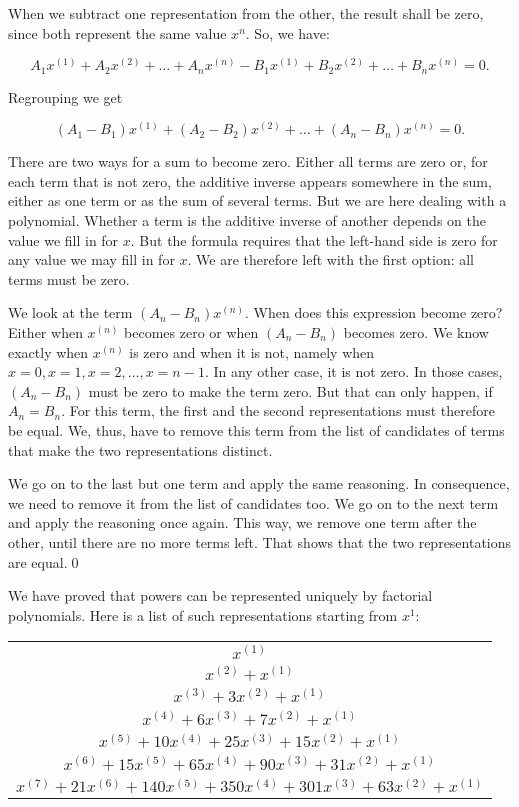 \documentclass[tikz]{scrreprt}
\begin{document}
When we subtract one representation from the other,
the result shall be zero, since both represent the
same value $x^n$. So, we have:

\begin{equation}
A_1x^{(1)} + A_2x^{(2)} + \dots + A_nx^{(n)} -
B_1x^{(1)} + B_2x^{(2)} + \dots + B_nx^{(n)} = 0.
\end{equation}

Regrouping we get

\begin{equation}
(A_1-B_1)x^{(1)} + (A_2-B_2)x^{(2)} + \dots + (A_n-B_n)x^{(n)} = 0.
\end{equation}

There are two ways for a sum to become zero.
Either all terms are zero or, for each term
that is not zero, the additive inverse
appears somewhere in the sum, either as
one term or as the sum of several terms.
But we are here dealing with a polynomial.
Whether a term is the additive inverse of another
depends on the value we fill in for $x$.
But the formula requires that the left-hand side
is zero for any value we may fill in for $x$.
We are therefore left with the first option:
all terms must be zero.

We look at the term $(A_n-B_n)x^{(n)}$.
When does this expression become zero?
Either when $x^{(n)}$ becomes zero or 
when $(A_n-B_n)$ becomes zero.
We know exactly when $x^{(n)}$ is zero
and when it is not, namely when
$x=0, x=1, x=2, \dots, x=n-1$.
In any other case, it is not zero.
In those cases, $(A_n-B_n)$ must be zero
to make the term zero. But that can only happen,
if $A_n = B_n$.
For this term, the first and the second
representations must therefore be equal.
We, thus, have to remove this term from
the list of candidates of terms
that make the two representations distinct.

We go on to the last but one term and
apply the same reasoning.
In consequence, we need to remove it
from the list of candidates too.
We go on to the next term and apply
the reasoning once again.
This way, we remove one term after the other,
until there are no more terms left.
That shows that the two representations are equal.\qed

We have proved that powers can be represented
uniquely by factorial polynomials. Here is a list
of such representations starting from $x^1$:

\begin{center}
\begin{tabular}{c}
$x^{(1)}$ \\
$x^{(2)} + x^{(1)}$ \\
$x^{(3)} + 3x^{(2)} + x^{(1)}$\\
$x^{(4)} + 6x^{(3)} + 7x^{(2)} + x^{(1)}$\\
$x^{(5)} + 10x^{(4)} + 25x^{(3)} +15x^{(2)} + x^{(1)}$ \\
$x^{(6)} + 15x^{(5)} + 65x^{(4)} + 90x^{(3)} + 31x^{(2)} + x^{(1)}$ \\
$x^{(7)} + 21x^{(6)} + 140x^{(5)} + 350x^{(4)} + 301x^{(3)} + 63x^{(2)} + x^{(1)}$  
\end{tabular}
\end{center}
\end{document}
